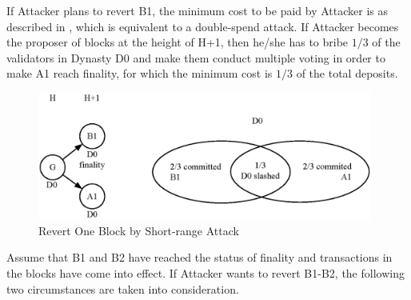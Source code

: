 
If Attacker plans to revert B1, the minimum cost to be paid by Attacker is as described in , which is equivalent to a double-spend attack. If Attacker becomes the proposer of blocks at the height of H+1, then he/she has to bribe $1/3$ of the validators in Dynasty D0 and make them conduct multiple voting in order to make A1 reach finality, for which the minimum cost is $1/3$ of the total deposits.


\begin{figure}[h]
\centering
\includegraphics[width=11cm]{./figs/revert1}
\caption{Revert One Block by Short-range Attack}
\label{fig:revert1}
\end{figure}

Assume that B1 and B2 have reached the status of finality and transactions in the blocks have come into effect. If Attacker wants to revert B1-B2, the following two circumstances are taken into consideration. 

